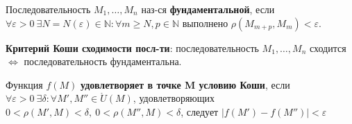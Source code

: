 



\bigbreak
Последовательность $M_1, \dots, M_n$ наз-ся \textbf{фундаментальной}, если $\forall \varepsilon > 0 ~ \exists N=N(\varepsilon) \in \mathbb{N}: \forall m \geq N, p \in \mathbb{N}$ выполнено $\rho(M_{m+p}, M_{m}) < \varepsilon$.

\textbf{Критерий Коши сходимости посл-ти}: последовательность $M_1, \dots, M_n$ сходится $\Longleftrightarrow$ последовательность фундаментальна.

\bigbreak
Функция $f(M)$ \textbf{удовлетворяет в точке M условию Коши}, если $\forall \varepsilon > 0 ~ \exists \delta: \forall M', M'' \in \mathring{U}(M)$, удовлетворяющих $0 < \rho(M',M) < \delta, ~ 0 < \rho(M'',M) < \delta$, следует $|f(M') - f(M'')| < \varepsilon$

